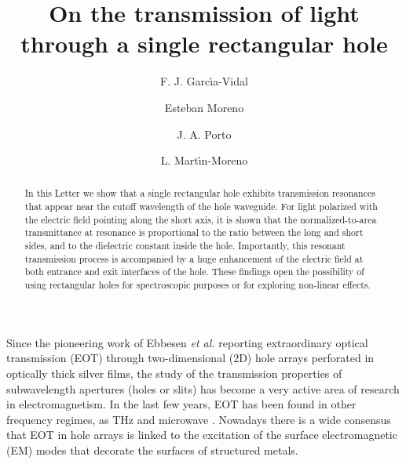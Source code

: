 \documentclass[aps,prl,twocolumn,showpacs,superscriptaddress,floatfix]{revtex4}
\begin{document}
\title{On the transmission of light through a single rectangular
hole}
\author{F. J. Garc\'{\i}a-Vidal}
\author{Esteban Moreno}
\author{J. A. Porto}
\author{L. Mart\'{\i}n-Moreno}



\begin{abstract}

In this Letter we show that a single rectangular hole exhibits
transmission resonances that appear near the cutoff wavelength of
the hole waveguide. For light polarized with the electric field
pointing along the short axis, it is shown that the
normalized-to-area transmittance at resonance is proportional to
the ratio between the long and short sides, and to the dielectric
constant inside the hole. Importantly, this resonant transmission
process is accompanied by a huge enhancement of the electric field
at both entrance and exit interfaces of the hole. These findings
open the possibility of using rectangular holes for spectroscopic
purposes or for exploring non-linear effects.
\end{abstract}


\maketitle




Since the pioneering work of Ebbesen {\it et al.} \cite{Ebbe98}
reporting extraordinary optical transmission (EOT) through
two-dimensional (2D) hole arrays perforated in optically thick
silver films, the study of the transmission properties of
subwavelength apertures (holes or slits) has become a very active
area of research in electromagnetism. In the last few years, EOT
has been found in other frequency regimes, as THz
\cite{Jaime,Grisch} and microwave \cite{beruete}. Nowadays there
is a wide consensus that EOT in hole arrays is linked to the
excitation of the surface electromagnetic (EM) modes
\cite{LMM01,Barnes} that decorate the surfaces of structured
metals.
\end{document}
